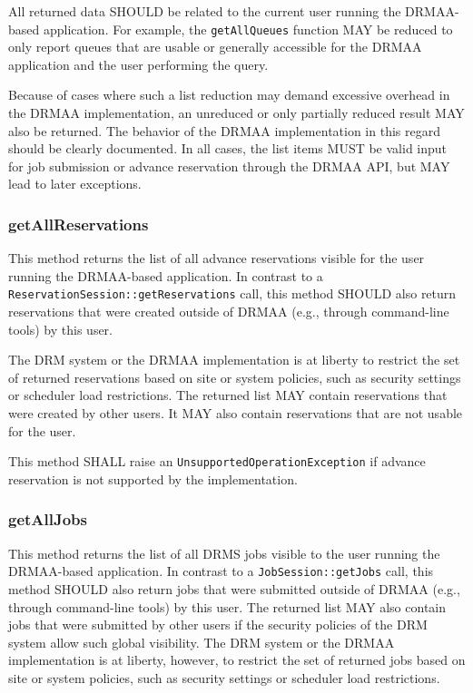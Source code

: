 \documentclass{article}
\newcommand{\h}[1]{\lstinline|#1|}
\begin{document}
All returned data SHOULD be related to the current user running the DRMAA-based application. For example, the \h{getAllQueues} function MAY be reduced to only report queues that are usable or generally accessible for the DRMAA application and the user performing the query. 

Because of cases where such a list reduction may demand excessive overhead in the DRMAA implementation, an unreduced or only partially reduced result MAY also be returned. The behavior of the DRMAA implementation in this regard should be clearly documented. In all cases, the list items MUST be valid input for job submission or advance reservation through the DRMAA API, but MAY lead to later exceptions.

\subsubsection{getAllReservations}
\label{sec:getallreservations}

This method returns the list of all advance reservations visible for the user running the DRMAA-based application. In contrast to a \h{ReservationSession::getReservations} call, this method SHOULD also return reservations that were created outside of DRMAA (e.g., through command-line tools) by this user. 

 The DRM system or the DRMAA implementation is at liberty to restrict the set of returned reservations based on site or system policies, such as security settings or scheduler load restrictions. The returned list MAY contain reservations that were created by other users. It MAY also contain reservations that are not usable for the user.

This method SHALL raise an \h{UnsupportedOperationException} if advance reservation is not supported by the implementation.

\subsubsection{getAllJobs}

This method returns the list of all DRMS jobs visible to the user running the DRMAA-based application. In contrast to a \h{JobSession::getJobs} call, this method SHOULD also return jobs that were submitted outside of DRMAA (e.g., through command-line tools) by this user. The returned list MAY also contain jobs that were submitted by other users if the security policies of the DRM system allow such global visibility. The DRM system or the DRMAA implementation is at liberty, however, to restrict the set of returned jobs based on site or system policies, such as security settings or scheduler load restrictions.
\end{document}
